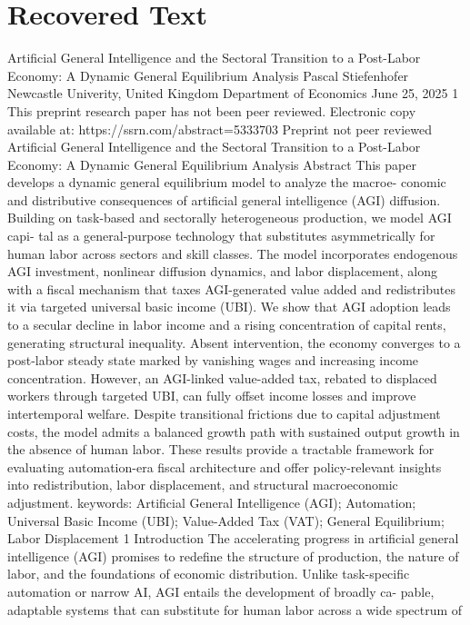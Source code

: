 \section{Recovered Text}
Artificial General Intelligence and the Sectoral
Transition to a Post-Labor Economy: A Dynamic
General Equilibrium Analysis
Pascal Stiefenhofer
Newcastle Univerity, United Kingdom
Department of Economics
June 25, 2025
1
This preprint research paper has not been peer reviewed. Electronic copy available at: https://ssrn.com/abstract=5333703
Preprint not peer reviewed
Artificial General Intelligence and the Sectoral
Transition to a Post-Labor Economy: A Dynamic
General Equilibrium Analysis
Abstract
This paper develops a dynamic general equilibrium model to analyze the macroe-
conomic and distributive consequences of artificial general intelligence (AGI) diffusion.
Building on task-based and sectorally heterogeneous production, we model AGI capi-
tal as a general-purpose technology that substitutes asymmetrically for human labor
across sectors and skill classes. The model incorporates endogenous AGI investment,
nonlinear diffusion dynamics, and labor displacement, along with a fiscal mechanism
that taxes AGI-generated value added and redistributes it via targeted universal basic
income (UBI). We show that AGI adoption leads to a secular decline in labor income
and a rising concentration of capital rents, generating structural inequality. Absent
intervention, the economy converges to a post-labor steady state marked by vanishing
wages and increasing income concentration. However, an AGI-linked value-added tax,
rebated to displaced workers through targeted UBI, can fully offset income losses and
improve intertemporal welfare. Despite transitional frictions due to capital adjustment
costs, the model admits a balanced growth path with sustained output growth in the
absence of human labor. These results provide a tractable framework for evaluating
automation-era fiscal architecture and offer policy-relevant insights into redistribution,
labor displacement, and structural macroeconomic adjustment.
keywords:
Artificial General Intelligence (AGI); Automation; Universal Basic Income
(UBI); Value-Added Tax (VAT); General Equilibrium; Labor Displacement
1
Introduction
The accelerating progress in artificial general intelligence (AGI) promises to redefine the
structure of production, the nature of labor, and the foundations of economic distribution.
Unlike task-specific automation or narrow AI, AGI entails the development of broadly ca-
pable, adaptable systems that can substitute for human labor across a wide spectrum of
